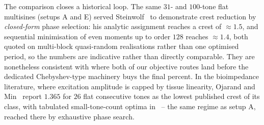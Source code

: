\documentclass[10pt,a4paper]{article}
\numberwithin{equation}{section}
\begin{document}
The comparison closes a historical loop. The same $31$- and $100$-tone flat multisines (setups A and E) served Steinwolf~\cite{steinwolf2011ifft} to demonstrate crest reduction by \emph{closed-form} phase selection: his analytic assignment reaches a crest of ${\approx}1.5$, and sequential minimisation of even moments up to order $128$ reaches ${\approx}1.4$, both quoted on multi-block quasi-random realisations rather than one optimised period, so the numbers are indicative rather than directly comparable. They are nonetheless consistent with where both of our objective routes land before the dedicated Chebyshev-type machinery buys the final percent. In the bioimpedance literature, where excitation amplitude is capped by tissue linearity, Ojarand and Min~\cite{ojarand2017crest} report $1.365$ for $26$ flat consecutive tones as the lowest published crest of its class, with tabulated small-tone-count optima in~\cite{ojarand2014crest} -- the same regime as setup A, reached there by exhaustive phase search.

\begin{table}[htb]
\centering
\footnotesize

\caption{Sampled crest factor (min/avg over random starts) on the five multisine benchmark setups of Retzler \emph{et al.}~\cite{retzler2022crest}. Published rows: $1000$ starts, quoted from~\cite{retzler2022crest}. Our rows: $\crestbenchseeds$ starts per setup, warm-started continuation ($\beta$ doubled $5$--$2560$ for the surrogate, $p$ doubled $4$--$512$ for $\ell_p$), scipy's L-BFGS-B with analytic gradients throughout.}
\label{tab:crestbench}
\end{table}


\end{document}
